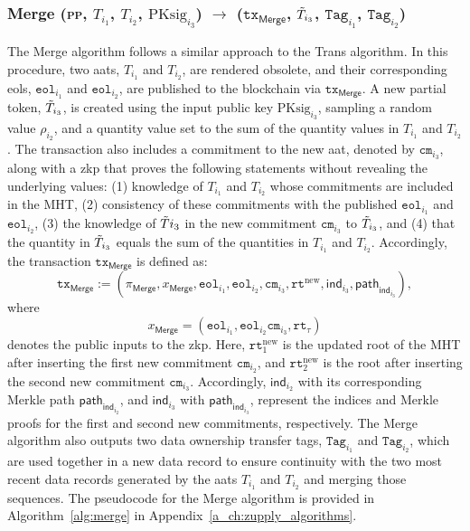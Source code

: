 \subsubsection{\textsf{Merge} (\textsc{pp}, $T_{i_{1}}$, $T_{i_{2}}$,  $\text{PKsig}_{i_3}$) $\rightarrow$ ($\texttt{tx}_{\textsf{Merge}}$, $\Tilde{T}_{i_3}$, $\texttt{Tag}_{i_{1}}$, $\texttt{Tag}_{i_{2}}$)}

The \textsf{Merge} algorithm follows a similar approach to the \textsf{Trans} algorithm. In this procedure, two \glspl{aat}, $T_{i_1}$ and $T_{i_2}$, are rendered obsolete, and their corresponding \glspl{eol}, $\texttt{eol}_{i_{1}}$ and $\texttt{eol}_{i_{2}}$, are published to the blockchain via $\texttt{tx}_{\textsf{Merge}}$. A new partial token, $\Tilde{T}_{i_3}$, is created using the input public key $\text{PKsig}_{i_3}$, sampling a random value $\rho_{i_2}$, and a quantity value set to the sum of the quantity values in $T_{i_1}$ and $T_{i_2}$.
The transaction also includes a commitment to the new \gls{aat}, denoted by $\texttt{cm}_{i_3}$, along with a \gls{zkp} that proves the following statements without revealing the underlying values: (1) knowledge of $T_{i_1}$ and $T_{i_2}$ whose commitments are included in the \textsf{MHT}, (2)  consistency of these commitments with the published $\texttt{eol}_{i_{1}}$ and $\texttt{eol}_{i_{2}}$, (3) the knowledge of $\Tilde{T}{i_3}$ in the new commitment $\texttt{cm}_{i_3}$ to $\Tilde{T}_{i_3}$, and (4) that the quantity in $\Tilde{T}_{i_3}$ equals the sum of the quantities in $T_{i_1}$ and $T_{i_2}$.  Accordingly, the transaction $\texttt{tx}_{\textsf{Merge}}$ is defined as:
\[
\texttt{tx}_\mathsf{Merge} :=(\pi_{\mathsf{Merge}}, x_\mathsf{Merge}, \texttt{eol}_{i_{1}}, \texttt{eol}_{i_{2}},  \texttt{cm}_{i_3}, \texttt{rt}^{\text{new}}, \mathsf{ind}_{i_3}, \mathsf{path}_{\mathsf{ind}_{i_3}}),
\]
where
\[
x_\mathsf{Merge} = (\texttt{eol}_{i_{1}}, \texttt{eol}_{i_{2}} \texttt{cm}_{i_3}, \texttt{rt}_\tau)
\]
denotes the public inputs to the \gls{zkp}. Here, $\texttt{rt}_1^{\text{new}}$ is the updated root of the \textsf{MHT} after inserting the first new commitment $\texttt{cm}_{i_2}$, and $\texttt{rt}_2^{\text{new}}$ is the root after inserting the second new commitment $\texttt{cm}_{i_3}$. Accordingly, $\mathsf{ind}_{i_2}$ with its corresponding Merkle path $\mathsf{path}_{\mathsf{ind}_{i_2}}$, and $\mathsf{ind}_{i_3}$ with $\mathsf{path}_{\mathsf{ind}_{i_3}}$, represent the indices and Merkle proofs for the first and second new commitments, respectively.
The \textsf{Merge} algorithm also outputs two data ownership transfer tags, $\texttt{Tag}_{i_{1}}$ and $\texttt{Tag}_{i_{2}}$, which are used together in a new data record to ensure continuity with the two most recent data records generated by the \glspl{aat} $T_{i_1}$ and $T_{i_2}$ and merging those sequences. The pseudocode for the \textsf{Merge} algorithm is provided in Algorithm~\ref{alg:merge} in Appendix~\ref{a_ch:zupply_algorithms}.

